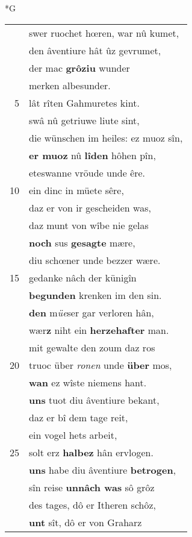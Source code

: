 \documentclass[8pt,a4paper,notitlepage]{article}
\begin{document}
\begin{table}[ht]
\begin{minipage}[t]{0.5\linewidth}
\small
\begin{center}*G
\end{center}
\begin{tabular}{rl}
 & swer ruochet hœren, war nû kumet,\\ 
 & den âventiure hât ûz gevrumet,\\ 
 & der mac \textbf{grôziu} wunder\\ 
 & merken albesunder.\\ 
5 & lât rîten Gahmuretes kint.\\ 
 & swâ nû getriuwe liute sint,\\ 
 & die wünschen im heiles: ez muoz sîn,\\ 
 & \textbf{er muoz} nû \textbf{lîden} hôhen pîn,\\ 
 & eteswanne vröude unde êre.\\ 
10 & ein dinc in müete sêre,\\ 
 & daz er von ir gescheiden was,\\ 
 & daz munt von wîbe nie gelas\\ 
 & \textbf{noch} sus \textbf{gesagte} mære,\\ 
 & diu schœner unde bezzer wære.\\ 
15 & gedanke nâch der künigîn\\ 
 & \textbf{begunden} krenken im den sin.\\ 
 & \textbf{den} m\textit{üe}ser gar verloren hân,\\ 
 & wær\textbf{z} niht ein \textbf{herzehafter} man.\\ 
 & mit gewalte den zoum daz ros\\ 
20 & truoc über \textit{ronen} unde \textbf{über} mos,\\ 
 & \textbf{wan} ez wîste niemens hant.\\ 
 & \textbf{uns} tuot diu âventiure bekant,\\ 
 & daz er bî dem tage reit,\\ 
 & ein vogel hets arbeit,\\ 
25 & solt erz \textbf{halbez} hân ervlogen.\\ 
 & \textbf{uns} habe diu âventiure \textbf{betrogen},\\ 
 & sîn reise \textbf{unnâch was} sô grôz\\ 
 & des tages, dô er Itheren schôz,\\ 
 & \textbf{unt} sît, dô er von Graharz\\ 

\end{tabular}
\end{minipage}
\end{table}
\end{document}
